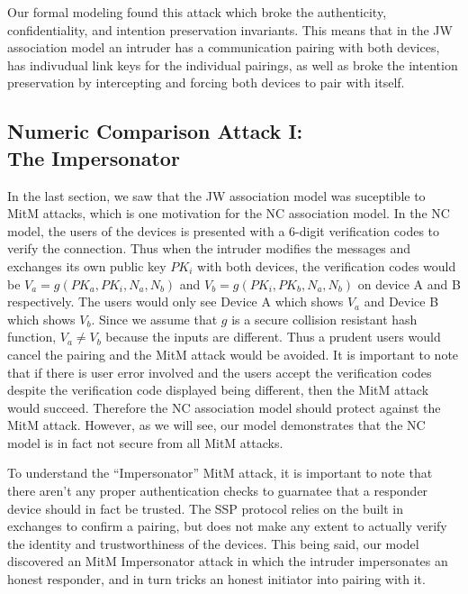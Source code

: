 \documentclass{acm_proc_article-sp}
\begin{document}
Our formal modeling found this attack which broke the authenticity, confidentiality, and intention preservation invariants. This means that in the JW association model an intruder has a communication pairing with both devices, has indivudual link keys for the individual pairings, as well as broke the intention preservation by intercepting and forcing both devices to pair with itself.

\subsection{Numeric Comparison Attack I:\\The Impersonator} 
In the last section, we saw that the JW association model was suceptible to MitM attacks, which is one motivation for the NC association model. In the NC model, the users of the devices is presented with a 6-digit verification codes to verify the connection. Thus when the intruder modifies the messages and exchanges its own public key $PK_i$ with both devices, the verification codes would be $V_a = g(PK_a, PK_i, N_a, N_b)$ and $V_b = g(PK_i, PK_b, N_a, N_b)$ on device A and B respectively. The users would only see Device A which shows $V_a$ and Device B which shows $V_b$. Since we assume that $g$ is a secure collision resistant hash function, $V_a \neq V_b$ because the inputs are different. Thus a prudent users would cancel the pairing and the MitM attack would be avoided. It is important to note that if there is user error involved and the users accept the verification codes despite the verification code displayed being different, then the MitM attack would succeed. Therefore the NC association model should protect against the MitM attack. However, as we will see, our model demonstrates that the NC model is in fact not secure from all MitM attacks.

To understand the ``Impersonator'' MitM attack, it is important to note that there aren't any proper authentication checks to guarnatee that a responder device should in fact be trusted. The SSP protocol relies on the built in exchanges to confirm a pairing, but does not make any extent to actually verify the identity and trustworthiness of the devices. This being said, our model discovered an MitM Impersonator attack in which the intruder impersonates an honest responder, and in turn tricks an honest initiator into pairing with it.
\end{document}
